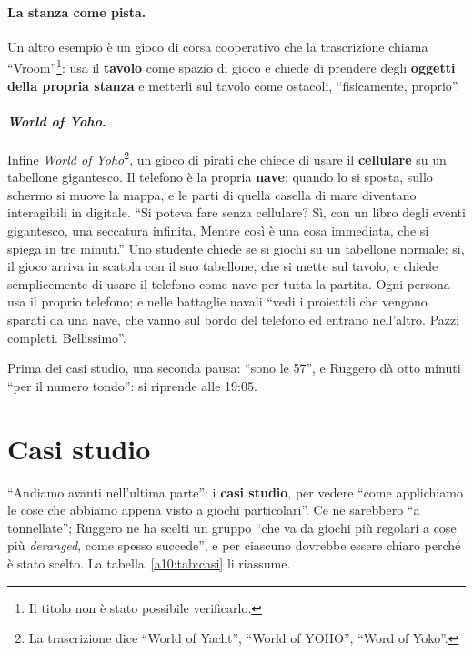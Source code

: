 \paragraph{La stanza come pista.} Un altro esempio è un gioco di corsa cooperativo che
la trascrizione chiama ``Vroom''\footnote{Il titolo non è stato possibile verificarlo.}:
usa il \textbf{tavolo} come spazio di gioco e chiede di prendere degli \textbf{oggetti
della propria stanza} e metterli sul tavolo come ostacoli, ``fisicamente, proprio''.

\paragraph{\emph{World of Yoho}.} Infine \emph{World of Yoho}\footnote{La trascrizione
dice ``World of Yacht'', ``World of YOHO'', ``Word of Yoko''.}, un gioco di pirati che
chiede di usare il \textbf{cellulare} su un tabellone gigantesco. Il telefono è la
propria \textbf{nave}: quando lo si sposta, sullo schermo si muove la mappa, e le parti
di quella casella di mare diventano interagibili in digitale. ``Si poteva fare senza
cellulare? Sì, con un libro degli eventi gigantesco, una seccatura infinita. Mentre così
è una cosa immediata, che si spiega in tre minuti.'' Uno studente chiede se si giochi su
un tabellone normale: sì, il gioco arriva in scatola con il suo tabellone, che si mette
sul tavolo, e chiede semplicemente di usare il telefono come nave per tutta la partita.
Ogni persona usa il proprio telefono; e nelle battaglie navali ``vedi i proiettili che
vengono sparati da una nave, che vanno sul bordo del telefono ed entrano nell'altro.
Pazzi completi. Bellissimo''.

\medskip
Prima dei casi studio, una seconda pausa: ``sono le 57'', e Ruggero dà otto minuti
``per il numero tondo'': si riprende alle 19:05.

\section{Casi studio}
\label{a10:sec:casi}

``Andiamo avanti nell'ultima parte'': i \textbf{casi studio}, per vedere ``come
applichiamo le cose che abbiamo appena visto a giochi particolari''. Ce ne sarebbero
``a tonnellate''; Ruggero ne ha scelti un gruppo ``che va da giochi più regolari a cose
più \emph{deranged}, come spesso succede'', e per ciascuno dovrebbe essere chiaro perché
è stato scelto. La tabella~\ref{a10:tab:casi} li riassume.

